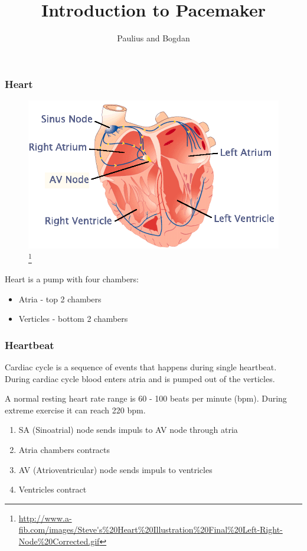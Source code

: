 \documentclass[xcolor=dvipsnames]{beamer}
\title[Pacemaker introduction]{Introduction  to Pacemaker}
\author{Paulius and Bogdan}
\begin{document}
  \begin{frame}
    \titlepage
  \end{frame}

  \begin{frame}
    \frametitle{Heart}
    \begin{figure}
      \begin{center}
        \includegraphics[width=0.7 \textwidth]{Figures/heart.png}
        \footnote{\url{http://www.a-fib.com/images/Steve's\%20Heart\%20Illustration\%20Final\%20Left-Right-Node\%20Corrected.gif}}
      \end{center}
    \end{figure}

    Heart is a pump with four chambers: 
    \begin{itemize}
      \item Atria - top 2 chambers
      \item Verticles - bottom 2 chambers
    \end{itemize}
  \end{frame}

  \begin{frame}
    \frametitle{Heartbeat}
    Cardiac cycle is a sequence of events that happens during single heartbeat. During cardiac cycle blood enters atria and is pumped out of the verticles.

    A normal resting heart rate range is 60 - 100 beats per minute (bpm). During extreme exercise it can reach 220 bpm.

    \begin{enumerate}
      \item SA (Sinoatrial) node sends impuls to AV node through atria
      \item Atria chambers contracts
      \item AV (Atrioventricular) node sends impuls to ventricles
      \item Ventricles contract 
    \end{enumerate}
  \end{frame}
\end{document}
